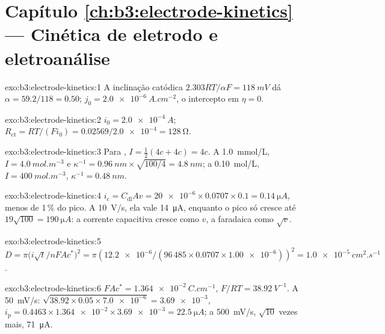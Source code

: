 \section*{Capítulo \ref{ch:b3:electrode-kinetics} --- Cinética de eletrodo e eletroanálise}

\begin{solution}{exo:b3:electrode-kinetics:1}
A inclinação catódica $2.303RT/\alpha F = \qty{118}{mV}$ dá $\alpha = 59.2/118 = 0.50$; $j_0 = \qty{2.0e-6}{A.cm^{-2}}$,
o intercepto em $\eta = 0$.
\end{solution}

\begin{solution}{exo:b3:electrode-kinetics:2}
$i_0 = \qty{2.0e-4}{A}$; $R_{\mathrm{ct}} = RT/(Fi_0) = 0.02569/\num{2.0e-4} = \qty{128}{\ohm}$.
\end{solution}

\begin{solution}{exo:b3:electrode-kinetics:3}
Para , $I = \frac12(4c + 4c) = 4c$. A \qty{1.0}{mmol/L}, $I = \qty{4.0}{mol.m^{-3}}$ e $\kappa^{-1} =
\qty{0.96}{nm} \times \sqrt{100/4} = \qty{4.8}{nm}$; a \qty{0.10}{mol/L}, $I = \qty{400}{mol.m^{-3}}$, $\kappa^{-1} = \qty{0.48}{nm}$.
\end{solution}

\begin{solution}{exo:b3:electrode-kinetics:4}
$i_{\mathrm c} = C_{\mathrm{dl}}Av = \num{20e-6} \times 0.0707 \times 0.1 = \qty{0.14}{\micro A}$, menos de 1\,\% do pico. A
\qty{10}{V/s}, ela vale \qty{14}{\micro A}, enquanto o pico só cresce até $19\sqrt{100} = \qty{190}{\micro A}$:
a corrente capacitiva cresce como $v$, a faradaica como $\sqrt v$.
\end{solution}

\begin{solution}{exo:b3:electrode-kinetics:5}
$D = \pi\bigl(i\sqrt t/nFAc^*\bigr)^2 = \pi(\num{12.2e-6}/(96\,485 \times 0.0707 \times \num{1.00e-6}))^2 =
\qty{1.0e-5}{cm^2.s^{-1}}$.
\end{solution}

\begin{solution}{exo:b3:electrode-kinetics:6}
$FAc^* = \qty{1.364e-2}{C.cm^{-1}}$, $F/RT = \qty{38.92}{V^{-1}}$. A \qty{50}{mV/s}: $\sqrt{38.92 \times 0.05 \times \num{7.0e-6}} =
\num{3.69e-3}$, $i_{\mathrm p} = 0.4463 \times \num{1.364e-2} \times \num{3.69e-3} = \qty{22.5}{\micro A}$; a \qty{500}{mV/s}, $\sqrt{10}$ vezes
mais, \qty{71}{\micro A}.
\end{solution}

